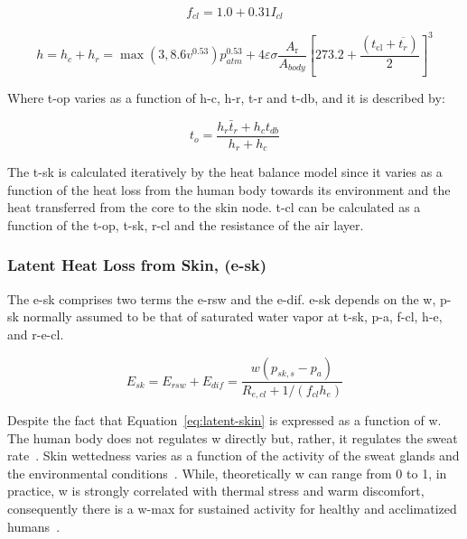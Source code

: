\begin{equation}
    f_{cl}=1.0 + 0.31 I_{cl} \label{eq:f-cl}
\end{equation}

\begin{equation}
    h=h_{c} + h_{r} = \max(3, 8.6 v^{0.53}) p_{atm}^{0.53} + 4 \varepsilon \sigma \frac{A_{\mathrm{r}}}{A_{body}}\left[273.2+\frac{\left(t_{\mathrm{cl}}+\overline{t_{r}}\right)}{2}\right]^{3}\label{eq:h}
\end{equation}


Where \ac{t-op} varies as a function of \ac{h-c}, \ac{h-r}, \ac{t-r} and \ac{t-db}, and it is described by:

\begin{equation}
    t_{o}=\frac{h_{r} \bar{t}_{r}+h_{c} t_{db}}{h_{r}+h_{c}}\label{eq:t-op}
\end{equation}

The \ac{t-sk} is calculated iteratively by the heat balance model since it varies as a function of the heat loss from the human body towards its environment and the heat transferred from the core to the skin node.
\Ac{t-cl} can be calculated as a function of the \ac{t-op}, \ac{t-sk}, \ac{r-cl} and the resistance of the air layer.

\subsubsection{Latent Heat Loss from Skin, (\acs{e-sk})}

The \acf{e-sk} comprises two terms the \ac{e-rsw} and the \ac{e-dif}.
\ac{e-sk} depends on the \ac{w}, \ac{p-sk} normally assumed to be that of saturated water vapor at \ac{t-sk}, \ac{p-a}, \ac{f-cl}, \ac{h-e}, and \ac{r-e-cl}.

\begin{equation}
    E_{s k}=E_{rsw}+E_{dif}=\frac{w\left(p_{s k, s}-p_{a}\right)}{R_{e, c l}+1 /\left(f_{c l} h_{e}\right)}\label{eq:latent-skin}
\end{equation}

Despite the fact that Equation~\ref{eq:latent-skin} is expressed as a function of \ac{w}.
The human body does not regulates \ac{w} directly but, rather, it regulates the sweat rate~\cite{ASHRA2017}.
Skin wettedness varies as a function of the activity of the sweat glands and the environmental conditions~\cite{ASHRA2017}.
While, theoretically \ac{w} can range from 0 to 1, in practice, \ac{w} is strongly correlated with thermal stress and warm discomfort, consequently there is a \ac{w-max} for sustained activity for healthy and acclimatized humans~\cite{ASHRA2017}.

